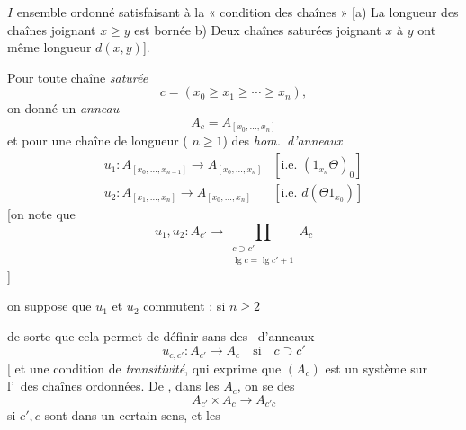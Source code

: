 \documentclass[11pt,a4paper]{article}
\begin{document}
$I$ ensemble ordonné satisfaisant à la « condition des chaînes »
[a) La longueur des chaînes joignant $x \geq y$ est bornée
b) Deux chaînes saturées joignant $x$ à $y$ ont même longueur
$d(x, y)$].

Pour toute chaîne \emph{saturée}
\[
c = (x_0 \geq x_1 \geq \cdots \geq x_n),
\]
on  donné un \emph{anneau}
\[
A_c = A_{[x_0, \ldots, x_n]}
\]
et pour une chaîne de longueur  (
$n \geq 1$) des \emph{hom.\ d'anneaux}
\[
\begin{array}{ll}
u_1 : A_{[x_0, \ldots, x_{n-1}]} \longrightarrow A_{[x_0, \ldots, x_n]} & [\text{i.e.\ } (1_{x_n}\Theta)_0] \\
u_2 : A_{[x_1, \ldots, x_n]} \longrightarrow A_{[x_0, \ldots, x_n]} & [\text{i.e.\ } d(\Theta 1_{x_0})]
\end{array}
\]
[on note que
\[
u_1, u_2 : A_{c'} \longrightarrow \prod_{\substack{c \supset c' \\ \lg c = \lg c' + 1}} A_c
\]
]

on suppose que $u_1$ et $u_2$ commutent : si $n \geq 2$


de sorte que cela permet de définir sans  des
\ d'anneaux
\[
u_{c,c'} : A_{c'} \longrightarrow A_{c} \quad \text{si} \quad c \supset c'
\]
[\struck{\ill{}} et \ill{} \ill{} \ill{} une condition de
\emph{transitivité}, qui exprime que $(A_c)$ est un système
 sur l'\ des chaînes ordonnées. De
, \ill{} \ill{} \ill{} \emph{}
dans les $A_c$, on se  des
\struck{\ill{}}  
\[
A_{c'} \times A_{c} \longrightarrow A_{c'c}
\]
si $c', c$ sont  dans un certain sens, et
 les
\end{document}
